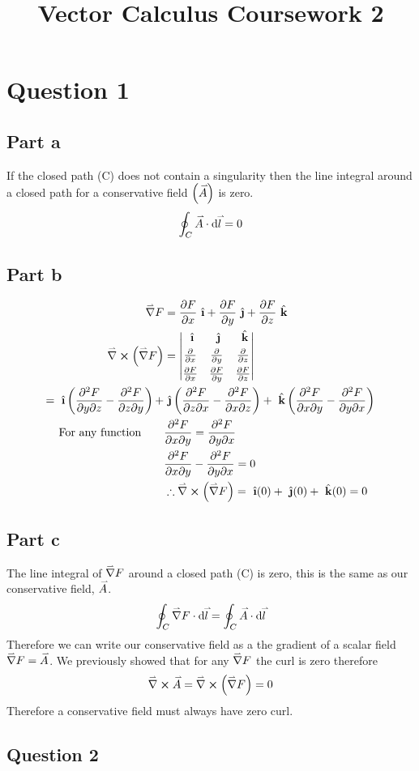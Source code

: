 \documentclass{article}
\title{Vector Calculus Coursework 2}
\newcommand{\ihat}{\ {\hat{\textbf{\i}}}}
\newcommand{\jhat}{\ {\hat{\textbf{\j}}}}
\newcommand{\khat}{\ {\hat{\mathbf{k}}}}
\renewcommand{\d}{\text{d}}
\renewcommand{\vec}[1]{\accentset{\rightharpoonup}{#1}}
\newcommand{\del}{\vec{\nabla}}
\newcommand{\dvecdot}[2]{\vec{#1}\cdot\d \vec{#2}}
\renewcommand{\curl}[3]{\begin{vmatrix}
    \vspace{0.1cm}
    \ihat & \jhat & \khat\\
    \vspace{0.1cm}
    \pdv{}{x} & \pdv{}{y} & \pdv{}{z}\\
    {#1} & {#2} & {#3}\\
\end{vmatrix}}
\begin{document}
\maketitle

\section*{Question 1}
\subsection*{Part a}

If the closed path (C) does not contain a singularity then the line integral around a closed path for a conservative 
field $\left(\vec{A}\right)$ is zero.
$$\oint_C \dvecdot{A}{l} = 0$$

\subsection*{Part b}
\begin{align*}
    \del F &= \pdv{F}{x}\ihat + \pdv{F}{y}\jhat + \pdv{F}{z}\khat\\
    \del \cross \left(\del F\right) &= \curl{\pdv{F}{x}}{\pdv{F}{y}}{\pdv{F}{z}}\\
    = \ihat\left(\pdv{F}{y}{z} - \pdv{F}{z}{y}\right) + 
    &\jhat\left(\pdv{F}{z}{x} - \pdv{F}{x}{z}\right) +
    \khat\left(\pdv{F}{x}{y} - \pdv{F}{y}{x}\right)\\
    \text{For any function}\quad\quad &\pdv{F}{x}{y} = \pdv{F}{y}{x}\\
    &\pdv{F}{x}{y} - \pdv{F}{y}{x} = 0\\
    &\therefore \del \cross \left(\del F\right) = \ihat(0) + \jhat(0) + \khat(0) = 0
\end{align*}

\subsection*{Part c}
The line integral of $\del F$ around a closed path (C) is zero, this is the same as our conservative field, $\vec{A}$.
$$\oint_C \del F \cdot \text{d}\vec{l}  = \oint_C \dvecdot{A}{l}$$
Therefore we can write our conservative field as a the gradient of a scalar field $\del F = \vec{A}$. We previously
showed that for any $\del F$ the curl is zero therefore
$$\del \cross \vec{A} = \del \cross \left(\del F\right) = 0$$
Therefore a conservative field must always have zero curl. 

\subsection*{Question 2}
\end{document}
